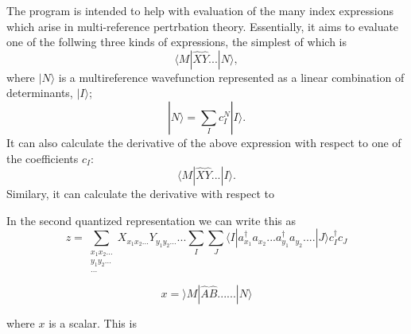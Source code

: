 \documentclass[12pt]{article}
\begin{document}
The program is intended to help with evaluation of the many index expressions which arise in multi-reference pertrbation theory. 
Essentially, it aims to evaluate one of the follwing three kinds of expressions, the simplest of which is
\begin{equation}
\langle M | \hat{X} \hat{Y} ... | N \rangle,
\end{equation}
where  $| N \rangle$  is a multireference wavefunction represented as a linear combination of determinants, $|I\rangle $;
\begin{equation}
|N\rangle = \sum_{I} c_{I}^{N}| I \rangle.
\end{equation} 
It can also calculate the derivative of the above expression with respect to one of the coefficients $c_{I}$:
\begin{equation}
\langle M | \hat{X} \hat{Y} ... | I \rangle.
\end{equation}
Similary, it can calculate the derivative with respect to   

In the second quantized representation we can write this as
\begin{equation}
z = \sum_{\substack{ x_{1}x_{2}...\\ y_{1}y_{2}... \\ ...}} X_{x_{1}x_{2}...} Y_{y_{1}y_{2}...} ...
\sum_{I}\sum_{J}
\langle I | a^{\dagger}_{x_{1}} a_{x_{2}}...a^{\dagger}_{y_{1}}a_{y_{2}}....| J \rangle 
 c^{\dagger}_{I}c_{J}
\end{equation}

\begin{equation}
x = \rangle M | \hat{A} \hat{B}...... | N \rangle
\end{equation}


where $x$ is a scalar. This is  
\end{document}
